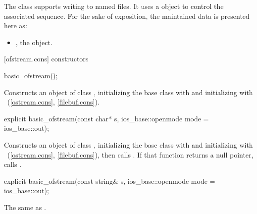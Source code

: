 \pnum
The class
supports writing to named files.
It uses a
object to control the associated
sequence.
For the sake of exposition, the maintained data is presented here as:
\begin{itemize}
\item
{}, the  object.
\end{itemize}

[ofstream.cons]{ constructors}

%
\begin{itemdecl}
basic_ofstream();
\end{itemdecl}

\begin{itemdescr}
\pnum
\effects
Constructs an object of class
,
initializing the base class with
and initializing  with
~(\ref{ostream.cons},
\ref{filebuf.cons}).
\end{itemdescr}

%
\begin{itemdecl}
explicit basic_ofstream(const char* s,
                        ios_base::openmode mode = ios_base::out);
\end{itemdecl}

\begin{itemdescr}
\pnum
\effects
Constructs an object of class
,
initializing the base class with
and initializing  with
~(\ref{ostream.cons},
\ref{filebuf.cons}),
then calls
.
If that function returns a null pointer, calls
.
\end{itemdescr}

%
\begin{itemdecl}
explicit basic_ofstream(const string& s,
                        ios_base::openmode mode = ios_base::out);
\end{itemdecl}

\begin{itemdescr}
\pnum
\effects The same as .
\end{itemdescr}

